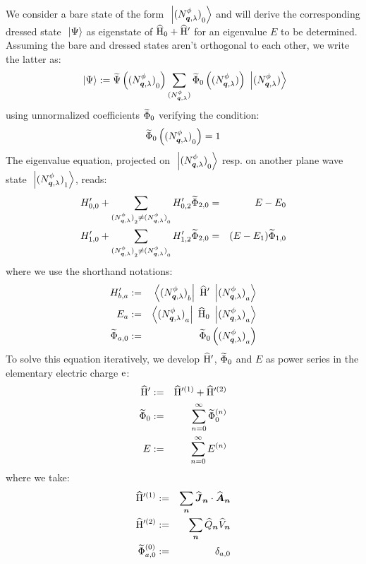 \documentclass[10pt,a4paper,twoside,openany]{book}
\begin{document}
We consider a bare state of the form $\ \left|{{({N}^{\phi}_{{\boldsymbol{q}}, {\lambda}})}_0}\right\rangle$ and will derive the corresponding dressed state $\ \left|{\Psi}\right\rangle$ as eigenstate of $\widehat{\mathrm H}_0 + \widehat{\mathrm H}'$ for an eigenvalue $E$ to be determined. Assuming the bare and dressed states aren't orthogonal to each other, we write the latter as:
\begin{equation*}
\ \left|{\Psi}\right\rangle := \widetilde{\Psi} \left( {({N}^{\phi}_{{\boldsymbol{q}}, {\lambda}})}_0 \right) \sum_{({N}^{\phi}_{{\boldsymbol{q}}, {\lambda}})} \widetilde{\Phi}_0 \left( ({N}^{\phi}_{{\boldsymbol{q}}, {\lambda}}) \right) \ \left|{({N}^{\phi}_{{\boldsymbol{q}}, {\lambda}})}\right\rangle
\end{equation*}
using unnormalized coefficients $\widetilde{\Phi}_0$ verifying the condition:
\begin{equation*}
\widetilde{\Phi}_0 \left( {({N}^{\phi}_{{\boldsymbol{q}}, {\lambda}})}_0 \right) = 1
\end{equation*}
The eigenvalue equation, projected on $\ \left|{{({N}^{\phi}_{{\boldsymbol{q}}, {\lambda}})}_0}\right\rangle$ resp. on another plane wave state $\ \left|{{({N}^{\phi}_{{\boldsymbol{q}}, {\lambda}})}_1}\right\rangle$, reads:
\begin{eqnarray*}
H'_{0,0} + \sum_{{({N}^{\phi}_{{\boldsymbol{q}}, {\lambda}})}_2 \neq {({N}^{\phi}_{{\boldsymbol{q}}, {\lambda}})}_0} H'_{0,2} \widetilde{\Phi}_{2,0} & = & E - E_0 \\
H'_{1,0} + \sum_{{({N}^{\phi}_{{\boldsymbol{q}}, {\lambda}})}_2 \neq {({N}^{\phi}_{{\boldsymbol{q}}, {\lambda}})}_0} H'_{1,2} \widetilde{\Phi}_{2,0} & = & ( E - E_1 ) \widetilde{\Phi}_{1,0}
\end{eqnarray*}
where we use the shorthand notations:
\begin{eqnarray*}
H'_{b,a} & := & \left\langle{{({N}^{\phi}_{{\boldsymbol{q}}, {\lambda}})}_b}\right|\  \widehat{\mathrm H}' \ \left|{{({N}^{\phi}_{{\boldsymbol{q}}, {\lambda}})}_a}\right\rangle \\
E_a & := & \left\langle{{({N}^{\phi}_{{\boldsymbol{q}}, {\lambda}})}_a}\right|\  \widehat{\mathrm H}_0 \ \left|{{({N}^{\phi}_{{\boldsymbol{q}}, {\lambda}})}_a}\right\rangle \\
\widetilde{\Phi}_{a,0} & := & \widetilde{\Phi}_0 \left( {({N}^{\phi}_{{\boldsymbol{q}}, {\lambda}})}_a \right)
\end{eqnarray*}
To solve this equation iteratively, we develop $\widehat{\mathrm H}'$, $\widetilde{\Phi}_0$ and $E$ as power series in the elementary electric charge $\mathrm e$:
\begin{eqnarray*}
\widehat{\mathrm H}' & := & \widehat{\mathrm H}'^{(1)} + \widehat{\mathrm H}'^{(2)} \\
\widetilde{\Phi}_0 & := & \sum_{n=0}^\infty \widetilde{\Phi}_0^{(n)} \\
E & := & \sum_{n=0}^\infty E^{(n)}
\end{eqnarray*}
where we take:
\begin{eqnarray*}
\widehat{\mathrm H}'^{(1)} & := & \sum_{\boldsymbol{n}} \widehat{\boldsymbol{J}}_{\boldsymbol{n}} \cdot \widehat{\boldsymbol{A}}_{\boldsymbol{n}} \\
\widehat{\mathrm H}'^{(2)} & := & \sum_{\boldsymbol{n}} \widehat{Q}_{\boldsymbol{n}} \widehat{V}_{\boldsymbol{n}} \\
\widetilde{\Phi}_{a,0}^{(0)} & := & \delta_{a,0}
\end{eqnarray*}
\end{document}
